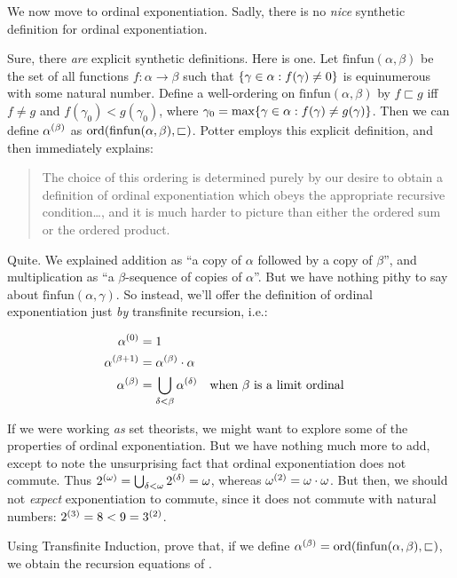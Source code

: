 \documentclass[../../../include/open-logic-section]{subfiles}
\begin{document}

We now move to ordinal exponentiation. Sadly, there is no \emph{nice}
synthetic definition for ordinal exponentiation.

Sure, there \emph{are} explicit synthetic definitions. Here is one.
Let $\text{finfun}(\alpha,\beta)$ be the set of all functions $f
\colon \alpha \to \beta$ such that $\{ \gamma \in
\alpha : f(\gamma) \neq 0 \}$ is equinumerous with some natural number.
Define a well-ordering on $\text{finfun}(\alpha,\beta)$ by $f
\sqsubset g$ iff $f \neq g$ and $f(\gamma_0) < g(\gamma_0)$, where
$\gamma_0 = \text{max}\{ \gamma \in \alpha : f(\gamma) \neq
g(\gamma) \}$. Then we can define $\alpha^{(\beta)}$ as
$\mathrm{ord}(\text{finfun}(\alpha, \beta), \sqsubset)$. Potter employs
this explicit definition, and then immediately explains:
\begin{quote}
	The choice of this ordering is determined purely by our desire to
	obtain a definition of ordinal exponentiation which obeys the
	appropriate recursive condition\ldots, and it is much harder to
	picture than either the ordered sum or the ordered product.
	\citep[p.~199]{Potter2004}
\end{quote}
Quite. We explained addition as ``a copy of $\alpha$ followed by a
copy of $\beta$'', and multiplication as ``a $\beta$-sequence of
copies of $\alpha$''. But we have nothing pithy to say about
$\text{finfun}(\alpha, \gamma)$. So instead, we'll offer the
definition of ordinal exponentiation just \emph{by} transfinite
recursion, i.e.:

\begin{defn}
\begin{align*}
	\ordexpo{\alpha}{0} &= 1\\
	\ordexpo{\alpha}{\beta\ordplus 1} &=\ordexpo{\alpha}{\beta} \ordtimes \alpha\\
	\ordexpo{\alpha}{\beta} &= \bigcup_{\delta < \beta}\ordexpo{\alpha}{\delta}& & \text{when $\beta$ is a limit ordinal}
\end{align*}
\end{defn}

If we were working \emph{as} set theorists, we might want to explore
some of the properties of ordinal exponentiation. But we have nothing
much more to add, except to note the unsurprising fact that ordinal
exponentiation does not commute. Thus $2^{(\omega)} =
\bigcup_{\delta < \omega}2^{(\delta)} = \omega$, whereas
$\omega^{(2)} = \omega \cdot \omega$. But then, we should
not \emph{expect} exponentiation to commute, since it does not commute
with natural numbers: $2^{(3)} = 8 < 9 = 3^{(2)}$. 

\begin{prob}
Using Transfinite Induction, prove that, if we define
$\alpha^{(\beta)} = \mathrm{ord}(\text{finfun}(\alpha, \beta),
\sqsubset)$, we obtain the recursion equations of
.
\end{prob}
\end{document}
